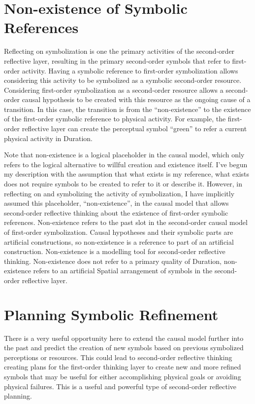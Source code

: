 \section{Non-existence of Symbolic References}

Reflecting on symbolization is one the primary activities of the
second-order reflective layer, resulting in the primary second-order
symbols that refer to first-order activity.  Having a symbolic
reference to first-order symbolization allows considering this
activity to be symbolized as a symbolic second-order resource.
Considering first-order symbolization as a second-order resource
allows a second-order causal hypothesis to be created with this
resource as the ongoing cause of a transition.  In this case, the
transition is from the ``non-existence'' to the existence of the
first-order symbolic reference to physical activity.  For example, the
first-order reflective layer can create the perceptual symbol
``green'' to refer a current physical activity in Duration.

Note that non-existence is a logical placeholder in the causal model,
which only refers to the logical alternative to willful creation and
existence itself.  I've begun my description with the assumption that
what exists is my reference, what exists does not require symbols to
be created to refer to it or describe it.  However, in reflecting on
and symbolizing the activity of symbolization, I have implicitly
assumed this placeholder, ``non-existence'', in the causal model that
allows second-order reflective thinking about the existence of
first-order symbolic references.  Non-existence refers to the past
slot in the second-order causal model of first-order symbolization.
Causal hypotheses and their symbolic parts are artificial
constructions, so non-existence is a reference to part of an
artificial construction.  Non-existence is a modelling tool for
second-order reflective thinking.  Non-existence does not refer to a
primary quality of Duration, non-existence refers to an artificial
Spatial arrangement of symbols in the second-order reflective layer.

\section{Planning Symbolic Refinement}

There is a very useful opportunity here to extend the causal model
further into the past and predict the creation of new symbols based on
previous symbolized perceptions or resources.  This could lead to
second-order reflective thinking creating plans for the first-order
thinking layer to create new and more refined symbols that may be
useful for either accomplishing physical goals or avoiding physical
failures.  This is a useful and powerful type of second-order
reflective planning.


